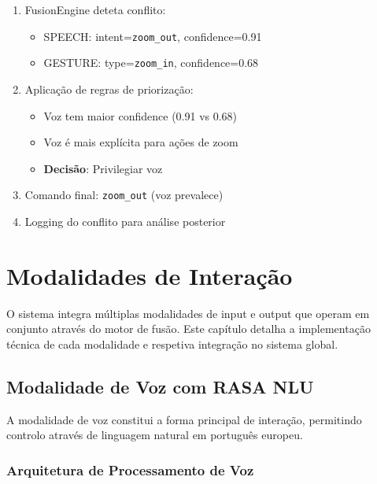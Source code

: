 \begin{enumerate}
    \item FusionEngine deteta conflito:
    \begin{itemize}
        \item SPEECH: intent=\texttt{zoom\_out}, confidence=0.91
        \item GESTURE: type=\texttt{zoom\_in}, confidence=0.68
    \end{itemize}

    \item Aplicação de regras de priorização:
    \begin{itemize}
        \item Voz tem maior confidence (0.91 vs 0.68)
        \item Voz é mais explícita para ações de zoom
        \item \textbf{Decisão}: Privilegiar voz
    \end{itemize}

    \item Comando final: \texttt{zoom\_out} (voz prevalece)

    \item Logging do conflito para análise posterior
\end{enumerate}



\chapter{Modalidades de Interação}

O sistema integra múltiplas modalidades de input e output que operam em conjunto através do motor de fusão. Este capítulo detalha a implementação técnica de cada modalidade e respetiva integração no sistema global.

\section{Modalidade de Voz com RASA NLU}

A modalidade de voz constitui a forma principal de interação, permitindo controlo através de linguagem natural em português europeu.

\subsection{Arquitetura de Processamento de Voz}

